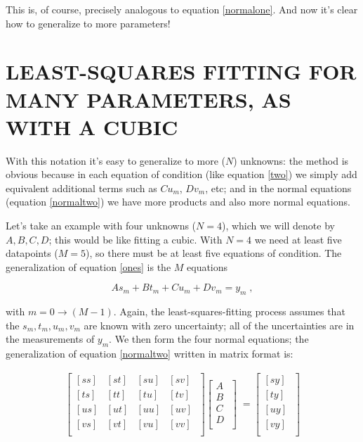 \documentclass[psfig,preprint]{aastex}
\begin{document}
\noindent This is, of course, precisely analogous to equation
\ref{normalone}. And now it's clear how to generalize to more
parameters!

\section{LEAST-SQUARES FITTING FOR MANY PARAMETERS, AS WITH A CUBIC}
\label{sectiontwo}

	With this notation it's easy to generalize to more ($N$)
unknowns: the method is obvious because in each equation of condition
(like equation \ref{two}) we simply add equivalent additional terms such
as $C u_m$, $D v_m$, etc; and in the normal equations (equation
\ref{normaltwo}) we have more products and also more normal equations. 

	Let's take an example with four unknowns ($N=4$), which we will
denote by $A, B, C, D$; this would be like fitting a cubic.  With $N=4$
we need at least five datapoints ($M=5$), so there must be at least
five equations of condition.  The generalization of equation \ref{ones}
is the $M$ equations

\begin{equation} \label{eqcond}
A s_m + B t_m + C u_m + D v_m = y_m \; ,
\end{equation}

\noindent with $m = 0 \rightarrow (M-1)$.  Again, the
least-squares-fitting process assumes that the $s_m, t_m, u_m, v_m$ are
known with zero uncertainty; all of the uncertainties are in the
measurements of $y_m$.  We then form the four normal equations; the
generalization of equation \ref{normaltwo} written in matrix format is:

\begin{eqnarray} \label{smeqn} 
\left[ 
\begin{array}{cccc} 
{[ ss ]} & {[ st ]} & {[ su ]} & {[ sv ]} \\ 
{[ ts ]} & {[ tt ]} & {[ tu ]} & {[ tv ]} \\ 
{[ us ]} & {[ ut ]} & {[ uu ]} & {[ uv ]} \\ 
{[ vs ]} & {[ vt ]} & {[ vu ]} & {[ vv ]} \\
\end{array} 
\; \right] 
\left[ 
\begin{array}{c} 
A \\ 
B \\ 
C \\ 
D \\
\end{array} 
\; \right] 
\; = 
\left[ 
\begin{array}{c} 
{[ s y ]} \\ 
{[ t y ]} \\ 
{[ u y ]} \\ 
{[ v y ]} \\ 
\end{array} 
\; \right]
\end{eqnarray} 
\end{document}
